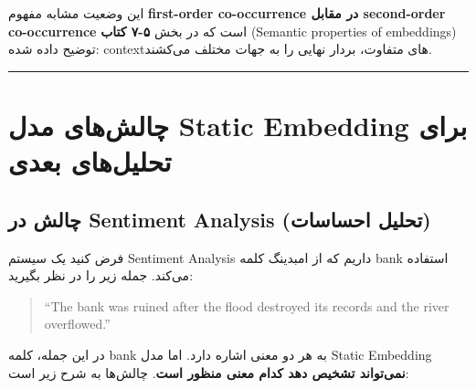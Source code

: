 \documentclass[11pt,a4paper]{article}
\newcommand{\en}[1]{\textenglish{#1}}
\newcommand{\separator}{\vspace{1em}\noindent\rule{\linewidth}{0.4pt}\vspace{1em}}
\begin{document}
این وضعیت مشابه مفهوم \textbf{\en{first-order co-occurrence} در مقابل \en{second-order co-occurrence}} است که در بخش \textbf{\en{۵-۷} کتاب} (\en{Semantic properties of embeddings}) توضیح داده شده: \en{context}‌های متفاوت، بردار نهایی را به جهات مختلف می‌کشند.

\separator
\newpage
\section{چالش‌های مدل \en{Static Embedding} برای تحلیل‌های بعدی}

\subsection{چالش در \en{Sentiment Analysis} (تحلیل احساسات)}
فرض کنید یک سیستم \en{Sentiment Analysis} داریم که از امبدینگ کلمه \en{bank} استفاده می‌کند. جمله زیر را در نظر بگیرید:

\begin{quote}
\en{``The bank was ruined after the flood destroyed its records and the river overflowed.''}
\end{quote}

در این جمله، کلمه \en{bank} به هر دو معنی اشاره دارد. اما مدل \en{Static Embedding} \textbf{نمی‌تواند تشخیص دهد کدام معنی منظور است}. چالش‌ها به شرح زیر است:
\end{document}
